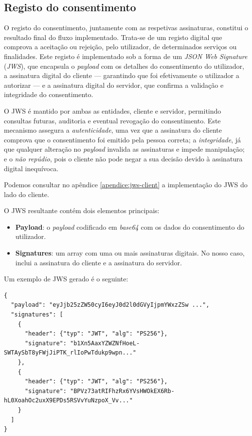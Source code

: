 \newpage

\subsection{Registo do consentimento}

O registo do consentimento, juntamente com as respetivas assinaturas, constitui o resultado final do fluxo implementado. Trata-se de um registo digital que comprova a aceitação ou rejeição, pelo utilizador, de determinados serviços ou finalidades. Este registo é implementado sob a forma de um \textit{JSON Web Signature} (\textit{JWS}), que encapsula o \textit{payload} com os detalhes do consentimento do utilizador, a assinatura digital do cliente — garantindo que foi efetivamente o utilizador a autorizar — e a assinatura digital do servidor, que confirma a validação e integridade do consentimento.

O JWS é mantido por ambas as entidades, cliente e servidor, permitindo consultas futuras, auditoria e eventual revogação do consentimento. Este mecanismo assegura a \textit{autenticidade}, uma vez que a assinatura do cliente comprova que o consentimento foi emitido pela pessoa correta; a \textit{integridade}, já que qualquer alteração no \textit{payload} invalida as assinaturas e impede manipulação; e o \textit{não repúdio}, pois o cliente não pode negar a sua decisão devido à assinatura digital inequívoca.

Podemos consultar no apêndice \ref{apendice:jws-client} a implementação do JWS do lado do cliente.

O JWS resultante contém dois elementos principais:

\begin{itemize}
    \item \textbf{Payload}: o \textit{payload} codificado em \textit{base64} com os dados do consentimento do utilizador.
    \item \textbf{Signatures}: um array com uma ou mais assinaturas digitais. No nosso caso, inclui a assinatura do cliente e a assinatura do servidor.
\end{itemize}

Um exemplo de JWS gerado é o seguinte:

\begin{lstlisting}
{
  "payload": "eyJjb25zZW50cyI6eyJ0d2l0dGVyIjpmYWxzZSw ...",
  "signatures": [
    {
      "header": {"typ": "JWT", "alg": "PS256"},
      "signature": "b1Xn5AaxYZWZNfHoeL-SWTAySbT8yFWjJiPTK_rlIoPwTdukp9wpn..."
    },
    {
      "header": {"typ": "JWT", "alg": "PS256"},
      "signature": "BPVz73atRIFhzRx6YVsHWOkEX6Rb-hL0XoahOc2uxX9EPDs5RSVvYuNzpoX_Vv..."
    }
  ]
}
\end{lstlisting}

